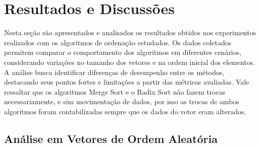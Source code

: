 \documentclass[12pt]{article}
\begin{document}
\section{Resultados e Discussões}

Nesta seção são apresentados e analisados os resultados obtidos nos experimentos realizados com os algoritmos de ordenação estudados. Os dados coletados permitem comparar o comportamento dos algoritmos em diferentes cenários, considerando variações no tamanho dos vetores e na ordem inicial dos elementos. A análise busca identificar diferenças de desempenho entre os métodos, destacando seus pontos fortes e limitações a partir das métricas avaliadas. Vale ressaltar que os algoritmos Merge Sort e o Radix Sort não fazem trocas necessariamente, e sim movimentação de dados, por isso as trocas de ambos algoritmos foram contabilizadas sempre que os dados do vetor eram alterados.

\subsection{Análise em Vetores de Ordem Aleatória}
\end{document}
